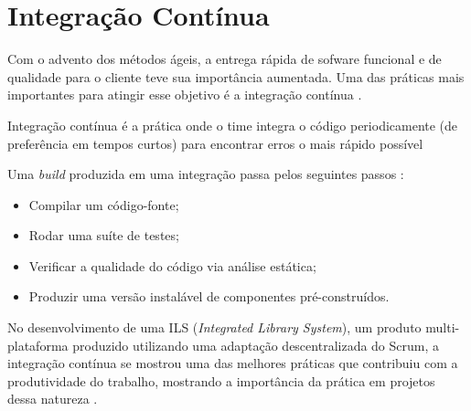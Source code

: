 \section{Integração Contínua}

Com o advento dos métodos ágeis, a entrega rápida de sofware funcional e de qualidade para o cliente teve sua importância aumentada. Uma das práticas mais importantes para atingir esse objetivo é a integração contínua \cite{continuous-integration}. 

Integração contínua é a prática onde o time integra o código periodicamente (de preferência em tempos curtos) para encontrar erros o mais rápido possível \cite{fowler}

Uma \textit{build} produzida em uma integração passa pelos seguintes passos \cite{continuous-integration}:
\begin{itemize}
\item Compilar um código-fonte;
\item Rodar uma suíte de testes; 
\item Verificar a qualidade do código via análise estática;
\item Produzir uma versão instalável de componentes pré-construídos. 
\end{itemize}

No desenvolvimento de uma ILS (\textit{Integrated Library System}), um produto multi-plataforma produzido utilizando uma adaptação descentralizada do Scrum, a integração contínua se mostrou uma das melhores práticas que contribuiu com a produtividade do trabalho, mostrando a importância da prática em projetos dessa natureza \cite{sutherland}.

